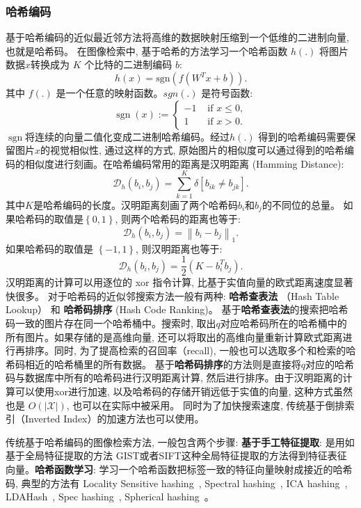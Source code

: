 \subsubsection{哈希编码}
基于哈希编码的近似最近邻方法将高维的数据映射压缩到一个低维的二进制向量, 也就是哈希码。 在图像检索中, 基于哈希的方法学习一个哈希函数 $h(.)$  将图片数据$x$转换成为 $K$ 个比特的二进制编码 $b$:
\begin{equation}
    h(x) = \text{sgn}(f(W^Tx + b)).
\end{equation}
其中 $f(.)$ 是一个任意的映射函数。$sgn(.)$ 是符号函数:
\begin{equation}
    \operatorname{sgn} (x) := \begin{cases}-1 & \text { if } x \leq 0,  \\ 1 & \text { if } x>0. \end{cases}
\end{equation}
$\operatorname{sgn} $将连续的向量二值化变成二进制哈希编码。经过$h(.)$ 得到的哈希编码需要保留图片$x$的视觉相似性, 通过这样的方式, 原始图片的相似度可以通过得到的哈希编码的相似度进行刻画。在哈希编码常用的距离是汉明距离 (Hamming Distance):
\begin{equation}
    \mathcal{D}_h(b_i, b_j) = \sum_{k = 1}^{K} \delta \left[b_{ik} \neq b_{jk} \right].
\end{equation}
其中$K$是哈希编码的长度。汉明距离刻画了两个哈希码$b_i$和$b_j$的不同位的总量。 如果哈希码的取值是$\left\{0, 1 \right\}$, 则两个哈希码的距离也等于:
\begin{equation}
    \mathcal{D}_h(b_i, b_j)=\left\|b_i - b_j\right\|_1.
\end{equation}
如果哈希码的取值是 $\left\{-1, 1\right\}$, 则汉明距离也等于:
\begin{equation}
    \mathcal{D}_h(b_i, b_j)= \frac{1}{2} \left ( K - b_i^Tb_j \right ).
\end{equation}
汉明距离的计算可以用逐位的 xor 指令计算, 比基于实值向量的欧式距离速度显著快很多。
对于哈希码的近似邻搜索方法一般有两种: \textbf{哈希查表法} （Hash Table Lookup） 和 \textbf{哈希码排序} (Hash Code Ranking)。 基于\textbf{哈希查表法}的搜索把哈希码一致的图片存在同一个哈希桶中。搜索时, 取出$q$对应哈希码所在的哈希桶中的所有图片。如果存储的是高维向量, 还可以将取出的高维向量重新计算欧式距离进行再排序。同时, 为了提高检索的召回率（recall), 一般也可以选取多个和检索的哈希码相近的哈希桶里的所有数据。 基于\textbf{哈希码排序}的方法则是直接将$q$对应的哈希码与数据库中所有的哈希码进行汉明距离计算, 然后进行排序。由于汉明距离的计算可以使用xor进行加速, 以及哈希码的存储开销远低于实值的向量, 这种方式虽然也是 $O(\left|\mathcal{X} \right|)$, 也可以在实际中被采用。 同时为了加快搜索速度, 传统基于倒排索引（Inverted Index）的加速方法也可以使用。 \par
传统基于哈希编码的图像检索方法, 一般包含两个步骤: \textbf{基于手工特征提取}: 是用如基于全局特征提取的方法 GIST或者SIFT这种全局特征提取的方法得到特征表征向量。\textbf{哈希函数学习}: 学习一个哈希函数把标签一致的特征向量映射成接近的哈希码, 典型的方法有 Locality Sensitive hashing~\cite{charikar2002similarity}, Spectral hashing~\cite{weiss2008spectral}, ICA hashing~\cite{he2011compact}, LDAHash~\cite{strecha2011ldahash}, Spec hashing~\cite{lin2010spec}, Spherical hashing~\cite{heo2012spherical}。
